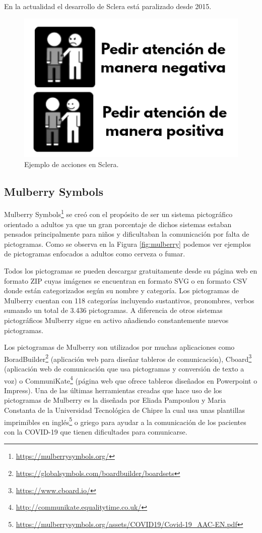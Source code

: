 En la actualidad el desarrollo de Sclera está paralizado desde 2015.



\begin{figure}[h!]
	\centering
	\includegraphics[scale=0.5]{Imagenes/Bitmap/Sclera}
	\caption{Ejemplo de acciones en Sclera.}
	\label{fig:sclera}
\end{figure}

\newpage
\subsection{Mulberry Symbols}
Mulberry Symbols\footnote{\url{https://mulberrysymbols.org/}} se creó con el propósito de ser un sistema pictográfico orientado a adultos ya que un gran porcentaje de dichos sistemas estaban pensados principalmente para niños y dificultaban la comunicación por falta de pictogramas. Como se observa en la Figura \ref{fig:mulberry} podemos ver ejemplos de pictogramas enfocados a adultos como cerveza o fumar.

Todos los pictogramas se pueden descargar gratuitamente desde su página web en formato ZIP cuyas imágenes se encuentran en formato SVG o en formato CSV donde están categorizados según su nombre y categoría. 
Los pictogramas de Mulberry cuentan con 118 categorías incluyendo sustantivos, pronombres, verbos sumando un total de 3.436 pictogramas. A diferencia de otros sistemas pictográficos Mulberry sigue en activo añadiendo constantemente nuevos pictogramas. 

Los pictogramas de Mulberry son utilizados por muchas aplicaciones como BoradBuilder\footnote{\url{ https://globalsymbols.com/boardbuilder/boardsets}} (aplicación web para diseñar tableros de comunicación), Cboard\footnote{\url{https://www.cboard.io/}} (aplicación web de comunicación que usa pictogramas y conversión de texto a voz) o CommuniKate\footnote{\url{http://communikate.equalitytime.co.uk/}} (página web que ofrece tableros diseñados en Powerpoint o Impress). Una de las últimas herramientas creadas que hace uso de los pictogramas de Mulberry es la diseñada por Eliada Pampoulou y Maria Constanta de la Universidad Tecnológica de Chipre la cual usa unas plantillas imprimibles en inglés\footnote{\url{https://mulberrysymbols.org/assets/COVID19/Covid-19_AAC-EN.pdf}} o griego para ayudar a la comunicación de los pacientes con la COVID-19 que tienen dificultades para comunicarse.



